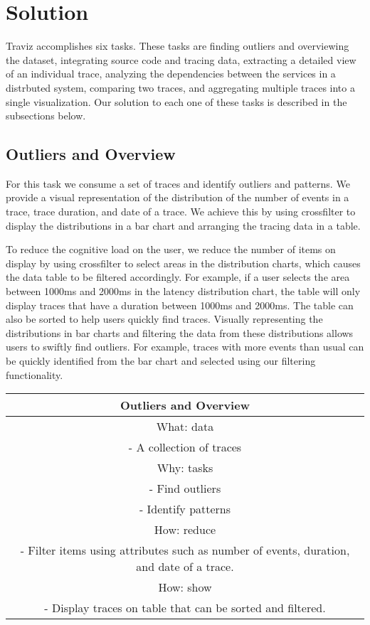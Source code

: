 \section{Solution}

Traviz accomplishes six tasks. These tasks are finding outliers and overviewing the dataset,
integrating source code and tracing data, extracting a detailed view of an individual trace, analyzing the
dependencies between the services in a distrbuted system, comparing two traces, and aggregating multiple traces
into a single visualization. Our solution to each one of these tasks is described in the subsections below.

\subsection{Outliers and Overview}

For this task we consume a set of traces and identify outliers and patterns.
We provide a visual representation of the distribution of the number of events in a trace, trace duration,
and date of a trace. We achieve this by
using crossfilter to display the distributions in a bar chart and arranging the tracing data in a table.

To reduce the cognitive load on the user, we reduce the number of items on display by using crossfilter
to select areas in the distribution charts, which causes the data table to be filtered accordingly. For example,
if a user selects the area between 1000ms and 2000ms in the latency distribution chart, the table will only display
traces that have a duration between 1000ms and 2000ms. The table can also be sorted to help users quickly find traces.
Visually representing the distributions in bar charts and filtering the data from these distributions allows users to swiftly
find outliers. For example, traces with more events than usual can be quickly identified from the bar chart and selected using our
filtering functionality.

\begin{center}
    \begin{tabular}{ |c| }
        \hline
        Outliers and Overview  \\
        \hline
        What: data \\
         - A collection of traces \\
        \hline
        Why: tasks \\
         - Find outliers \\
         - Identify patterns \\
        \hline
        How: reduce \\
         - Filter items using attributes such as number of events, duration,
        and date of a trace. \\
        How: show \\
         - Display traces on table that can be sorted and filtered.
        \end{tabular}
\end{center}



